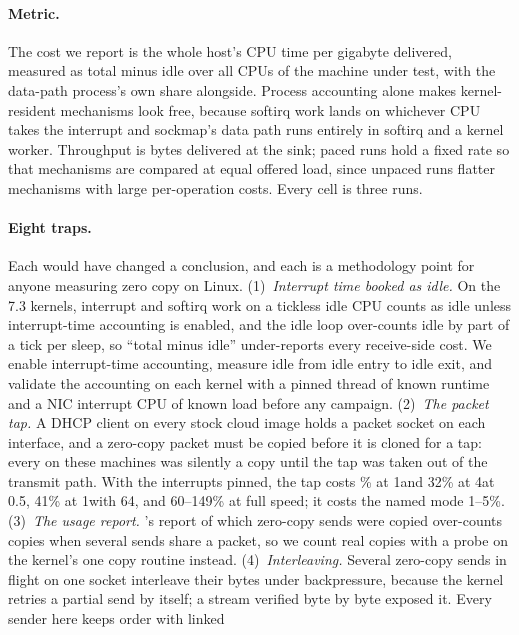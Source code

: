 \paragraph{Metric.} The cost we report is the whole host's CPU time per gigabyte delivered,
measured as total minus idle over all CPUs of the machine under test, with the data-path
process's own share alongside. Process accounting alone makes kernel-resident mechanisms look
free, because softirq work lands on whichever CPU takes the interrupt and sockmap's data path
runs entirely in softirq and a kernel worker. Throughput is bytes delivered at the sink; paced
runs hold a fixed rate so that mechanisms are compared at equal offered load, since unpaced
runs flatter mechanisms with large per-operation costs. Every cell is three runs.

\paragraph{Eight traps.} Each would have changed a conclusion, and each is a methodology point
for anyone measuring zero copy on Linux. (1)~\emph{Interrupt time booked as idle.} On the 7.3
kernels, interrupt and softirq work on a tickless idle CPU counts as idle unless interrupt-time
accounting is enabled, and the idle loop over-counts idle by part of a tick per sleep, so
``total minus idle'' under-reports every receive-side cost. We enable interrupt-time
accounting, measure idle from idle entry to idle exit, and validate the accounting on each
kernel with a pinned thread of known runtime and a NIC interrupt CPU of known load before any
campaign. (2)~\emph{The packet tap.} A DHCP client on every stock cloud image holds a packet
socket on each interface, and a zero-copy packet must be copied before it is cloned for a tap:
every \sendzc on these machines was silently a copy until the tap was taken out of the transmit
path. With the interrupts pinned, the tap costs \% at 1\KiB and 32\% at 4\KiB at
0.5\GBs, 41\% at 1\GBs with 64\KiB, and 60--149\% at full speed; it costs the named mode
1--5\%. %
(3)~\emph{The usage report.} \iouring's report of which zero-copy sends were copied over-counts
copies when several sends share a packet, so we count real copies with a probe on the kernel's
one copy routine instead. (4)~\emph{Interleaving.} Several zero-copy sends in flight on one
socket interleave their bytes under backpressure, because the kernel retries a partial send by
itself; a stream verified byte by byte exposed it. Every sender here keeps order with linked
